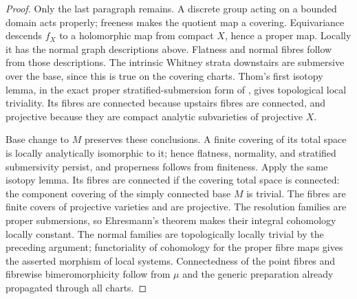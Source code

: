 \begin{proof}
Only the last paragraph remains. A discrete group acting on a bounded domain acts properly; freeness makes the quotient map a covering. Equivariance descends $f_X$ to a holomorphic map from compact $X$, hence a proper map. Locally it has the normal graph descriptions above. Flatness and normal fibres follow from those descriptions. The intrinsic Whitney strata downstairs are submersive over the base, since this is true on the covering charts. Thom's first isotopy lemma, in the exact proper stratified-submersion form of \cite[Proposition~11.1]{Mather1970}, gives topological local triviality. Its fibres are connected because upstairs fibres are connected, and projective because they are compact analytic subvarieties of projective $X$.

Base change to $M$ preserves these conclusions. A finite covering of its total space is locally analytically isomorphic to it; hence flatness, normality, and stratified submersivity persist, and properness follows from finiteness. Apply the same isotopy lemma. Its fibres are connected if the covering total space is connected: the component covering of the simply connected base $M$ is trivial. The fibres are finite covers of projective varieties and are projective. The resolution families are proper submersions, so Ehresmann's theorem makes their integral cohomology locally constant. The normal families are topologically locally trivial by the preceding argument; functoriality of cohomology for the proper fibre maps gives the asserted morphism of local systems. Connectedness of the point fibres and fibrewise bimeromorphicity follow from $\mu$ and the generic preparation already propagated through all charts.
\end{proof}
